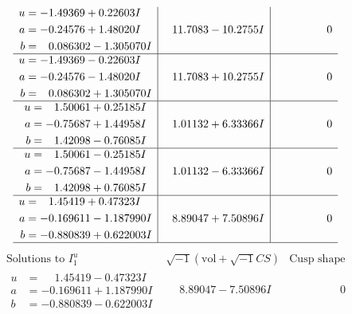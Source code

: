 \documentclass[1p]{elsarticle_modified}
\theoremstyle{definition}
\newcommand{\I}{\sqrt{-1}}
\begin{document}
$$\begin{array}{c|c|c}
\begin{aligned}
u &= -1.49369 + 0.22603 I \\
a &= -0.24576 + 1.48020 I \\
b &= \phantom{-}0.086302 - 1.305070 I\end{aligned}
 & \phantom{-}11.7083 - 10.2755 I & \phantom{-0.000000 } 0 \\ \hline\begin{aligned}
u &= -1.49369 - 0.22603 I \\
a &= -0.24576 - 1.48020 I \\
b &= \phantom{-}0.086302 + 1.305070 I\end{aligned}
 & \phantom{-}11.7083 + 10.2755 I & \phantom{-0.000000 } 0 \\ \hline\begin{aligned}
u &= \phantom{-}1.50061 + 0.25185 I \\
a &= -0.75687 + 1.44958 I \\
b &= \phantom{-}1.42098 - 0.76085 I\end{aligned}
 & \phantom{-}1.01132 + 6.33366 I & \phantom{-0.000000 } 0 \\ \hline\begin{aligned}
u &= \phantom{-}1.50061 - 0.25185 I \\
a &= -0.75687 - 1.44958 I \\
b &= \phantom{-}1.42098 + 0.76085 I\end{aligned}
 & \phantom{-}1.01132 - 6.33366 I & \phantom{-0.000000 } 0 \\ \hline\begin{aligned}
u &= \phantom{-}1.45419 + 0.47323 I \\
a &= -0.169611 - 1.187990 I \\
b &= -0.880839 + 0.622003 I\end{aligned}
 & \phantom{-}8.89047 + 7.50896 I & \phantom{-0.000000 } 0\\
 \hline 
 \end{array}$$\newpage$$\begin{array}{c|c|c}  
\text{Solutions to }I^u_{1}& \I (\text{vol} + \sqrt{-1}CS) & \text{Cusp shape}\\
 \hline 
\begin{aligned}
u &= \phantom{-}1.45419 - 0.47323 I \\
a &= -0.169611 + 1.187990 I \\
b &= -0.880839 - 0.622003 I\end{aligned}
 & \phantom{-}8.89047 - 7.50896 I & \phantom{-0.000000 } 0 \\ \hline\begin{aligned}

\end{aligned}
\end{array}$$
\end{document}
